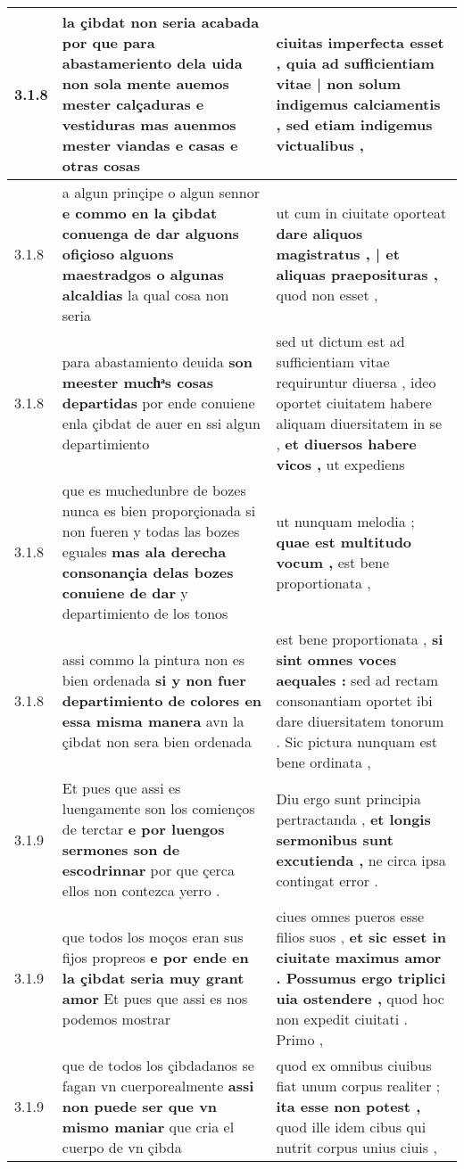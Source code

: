 \begin{tabular}{|p{1cm}|p{6.5cm}|p{6.5cm}|}
3.1.8 & la çibdat non seria acabada \textbf{ por que para abastameriento dela uida non sola mente auemos mester calçaduras e vestiduras } mas auenmos mester viandas e casas e otras cosas & ciuitas imperfecta esset , \textbf{ quia ad sufficientiam vitae | non solum indigemus calciamentis , } sed etiam indigemus victualibus , \\\hline
3.1.8 & a algun prinçipe o algun sennor \textbf{ e commo en la çibdat conuenga de dar alguons ofiçioso alguons maestradgos o algunas alcaldias } la qual cosa non seria & ut cum in ciuitate oporteat \textbf{ dare aliquos magistratus , | et aliquas praeposituras , } quod non esset , \\\hline
3.1.8 & para abastamiento deuida \textbf{ son meester muchͣs cosas departidas } por ende conuiene enla çibdat de auer en ssi algun departimiento & sed ut dictum est ad sufficientiam vitae requiruntur diuersa , ideo oportet ciuitatem habere aliquam diuersitatem in se , \textbf{ et diuersos habere vicos , } ut expediens \\\hline
3.1.8 & que es muchedunbre de bozes nunca es bien proporçionada si non fueren y todas las bozes eguales \textbf{ mas ala derecha consonançia delas bozes conuiene de dar } y departimiento de los tonos & ut nunquam melodia ; \textbf{ quae est multitudo vocum , } est bene proportionata , \\\hline
3.1.8 & assi commo la pintura non es bien ordenada \textbf{ si y non fuer departimiento de colores en essa misma manera } avn la çibdat non sera bien ordenada & est bene proportionata , \textbf{ si sint omnes voces aequales : } sed ad rectam consonantiam oportet ibi dare diuersitatem tonorum . Sic pictura nunquam est bene ordinata , \\\hline
3.1.9 & Et pues que assi es luengamente son los comienços de terctar \textbf{ e por luengos sermones son de escodrinnar } por que çerca ellos non contezca yerro . & Diu ergo sunt principia pertractanda , \textbf{ et longis sermonibus sunt excutienda , } ne circa ipsa contingat error . \\\hline
3.1.9 & que todos los moços eran sus fijos propreos \textbf{ e por ende en la çibdat seria muy grant amor } Et pues que assi es nos podemos mostrar & ciues omnes pueros esse filios suos , \textbf{ et sic esset in ciuitate maximus amor . Possumus ergo triplici uia ostendere , } quod hoc non expedit ciuitati . Primo , \\\hline
3.1.9 & que de todos los çibdadanos se fagan vn cuerporealmente \textbf{ assi non puede ser que vn mismo maniar } que cria el cuerpo de vn çibda & quod ex omnibus ciuibus fiat unum corpus realiter ; \textbf{ ita esse non potest , } quod ille idem cibus qui nutrit corpus unius ciuis , \\\hline

\end{tabular}
